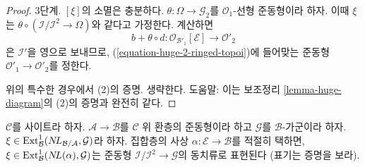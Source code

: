 \begin{proof}
\medskip\noindent
3단계. $[\xi]$의 소멸은 충분하다.
$\theta : \Omega \to \mathcal{G}_2$를 $\mathcal{O}_1$-선형 준동형이라
하자. 이때 $\xi$는
$\theta \circ (\mathcal{I}/\mathcal{I}^2 \to \Omega)$와 같다고
가정한다. 계산하면
$$
b + \theta \circ d :
\mathcal{O}_{\mathcal{B}'_1}[\mathcal{E}]
\longrightarrow
\mathcal{O}'_2
$$
은 $\mathcal{I}'$을 영으로 보내므로, (\ref{equation-huge-2-ringed-topoi})에
들어맞는 준동형 $\mathcal{O}'_1 \to \mathcal{O}'_2$를 정한다.

\medskip\noindent
위의 특수한 경우에서 (2)의 증명. 생략한다. 도움말: 이는 보조정리
\ref{lemma-huge-diagram}의 (2)의 증명과 완전히 같다.
\end{proof}

\begin{lemma}
\label{lemma-NL-represent-ext-class-ringed-topoi}
$\mathcal{C}$를 사이트라 하자. $\mathcal{A} \to \mathcal{B}$를
$\mathcal{C}$ 위 환층의 준동형이라 하고 $\mathcal{G}$를
$\mathcal{B}$-가군이라 하자.
$\xi \in \mathop{\mathrm{Ext}}\nolimits^1_\mathcal{B}(\mathop{N\!L}\nolimits_{\mathcal{B}/\mathcal{A}}, \mathcal{G})$라
하자. 집합층의 사상 $\alpha : \mathcal{E} \to \mathcal{B}$를 적절히
택하면, $\xi \in \mathop{\mathrm{Ext}}\nolimits^1_\mathcal{B}(\mathop{N\!L}\nolimits(\alpha), \mathcal{G})$는 준동형
$\mathcal{I}/\mathcal{I}^2 \to \mathcal{G}$의 동치류로 표현된다
(표기는 증명을 보라).
\end{lemma}

